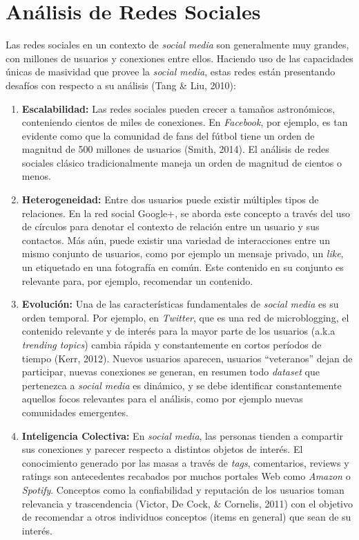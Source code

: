 \section{An\'alisis de Redes Sociales}

Las redes sociales en un contexto de \textit{social media} son generalmente muy grandes, con millones de usuarios y conexiones entre ellos. Haciendo uso de las capacidades únicas de masividad que provee la \textit{social media}, estas redes están presentando desafíos con respecto a su análisis (Tang & Liu, 2010):

\begin{enumerate}[I]
	\item \textbf{Escalabilidad:} Las redes sociales pueden crecer a tamaños astronómicos, conteniendo cientos de miles de conexiones. En \textit{Facebook}, por ejemplo, es tan evidente como que la comunidad de fans del fútbol tiene un orden de magnitud de 500 millones de usuarios (Smith, 2014). El análisis de redes sociales clásico tradicionalmente maneja un orden de magnitud de cientos o menos.
	\item \textbf{Heterogeneidad:} Entre dos usuarios puede existir múltiples tipos de relaciones. En la red social Google+, se aborda este concepto a través del uso de círculos para denotar el contexto de relación entre un usuario y sus contactos. Más aún, puede existir una variedad de interacciones entre un mismo conjunto de usuarios, como por ejemplo un mensaje privado, un \textit{like}, un etiquetado en una fotografía en común. Este contenido en su conjunto es relevante para, por ejemplo, recomendar un contenido.
	\item \textbf{Evolución:} Una de las características fundamentales de \textit{social media} es su orden temporal. Por ejemplo, en \textit{Twitter}, que es una red de microblogging, el contenido relevante y de interés para la mayor parte de los usuarios (a.k.a \textit{trending topics}) cambia rápida y constantemente en cortos períodos de tiempo (Kerr, 2012). Nuevos usuarios aparecen, usuarios “veteranos” dejan de participar, nuevas conexiones se generan, en resumen todo \textit{data\textit{set}} que pertenezca a \textit{social media} es dinámico, y se debe identificar constantemente aquellos focos relevantes para el análisis, como por ejemplo nuevas comunidades emergentes.
	\item \textbf{Inteligencia Colectiva:} En \textit{social media}, las personas tienden a compartir sus conexiones y parecer respecto a distintos objetos de interés. El conocimiento generado por las masas a través de \textit{tags}, comentarios, reviews y ratings son antecedentes recabados por muchos portales Web como \textit{Amazon} o \textit{Spotify}. Conceptos como la confiabilidad y reputación de los usuarios toman relevancia y trascendencia (Victor, De Cock, & Cornelis, 2011) con el objetivo de recomendar a otros individuos conceptos (items en general) que sean de su interés.

\end{enumerate}
